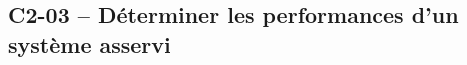 \subsection{C2-03 -- Déterminer les performances d'un système asservi}

\renewcommand{\repExo}{../../ExercicesCompetences/C2_MettreEnOeuvreDemarche/C2_03_PerformancesSLCI}

\renewcommand{\td}{501_Divers}
\graphicspath{{\repStyle/png/}{\repExo/\td/images/}}


\renewcommand{\td}{509_Divers}
\graphicspath{{\repStyle/png/}{\repExo/\td/images/}}


